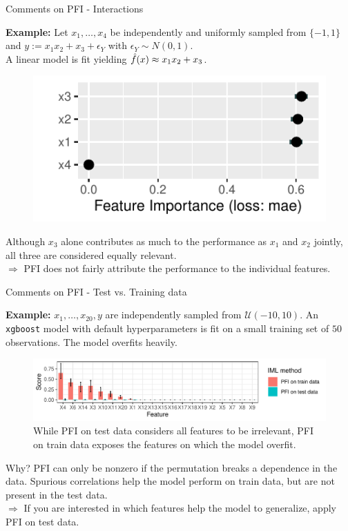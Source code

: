 \documentclass[11pt,compress,t,notes=noshow, aspectratio=169, xcolor=table]{beamer}
\begin{document}
\begin{vbframe}{Comments on PFI - Interactions}

\textbf{Example:} Let $x_1, \dots, x_4$ be independently and uniformly sampled from $\{-1, 1\}$ and $y:= x_1 x_2 + x_3 + \epsilon_Y$ with $\epsilon_Y \sim N(0, 1)$.\\
A linear model is fit yielding $\fh(x) \approx x_1 x_2 + x_3$.\\

\begin{figure}
\centering
  \includegraphics[width=0.5\linewidth]{figure_man/pfi_interactions.pdf}
\end{figure}

Although $x_3$ alone contributes as much to the performance as $x_1$ and $x_2$ jointly, all three are considered equally relevant.\\
\lz
$\Rightarrow$ PFI does not fairly attribute the performance to the individual features.
\end{vbframe}

\begin{vbframe}{Comments on PFI - Test vs. Training data}

\textbf{Example:} $x_1, \dots, x_{20}, y$ are independently sampled from $\mathcal{U} (-10, 10)$. An \texttt{xgboost} model with default hyperparameters is fit on a small training set of $50$ observations. The model overfits heavily.\\

\begin{figure}
  \includegraphics[width=0.8\linewidth]{figure_man/pfi_test_vs_train.pdf}
  \caption{While PFI on test data considers all features to be irrelevant, PFI on train data exposes the features on which the model overfit.}
\end{figure}

Why? PFI can only be nonzero if the permutation breaks a dependence in the data. Spurious correlations help the model perform on train data, but are not present in the test data.\\
$\Rightarrow$ If you are interested in which features help the model to generalize, apply PFI on test data.
  
\end{vbframe}
\end{document}
